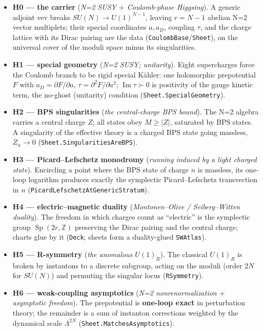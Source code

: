 \documentclass[11pt]{article}
\newcommand{\Z}{\mathbb{Z}}
\newcommand{\Sp}{\operatorname{Sp}}
\newcommand{\Imag}{\operatorname{Im}}
\newcommand{\code}[1]{\texttt{#1}}
\begin{document}
\begin{itemize}
\item \textbf{H0 --- the carrier} (\emph{N=2 SUSY $+$ Coulomb-phase Higgsing}). A generic adjoint
vev breaks $SU(N)\to U(1)^{N-1}$, leaving $r=N-1$ abelian N=2 vector multiplets; their special
coordinates $a, a_D$, coupling $\tau$, and the charge lattice with its Dirac pairing are the data
(\code{CoulombBase}/\code{Sheet}), on the universal cover of the moduli space minus its singularities.
\item \textbf{H1 --- special geometry} (\emph{N=2 SUSY; unitarity}). Eight supercharges force the
Coulomb branch to be rigid special K\"ahler: one holomorphic prepotential $F$ with
$a_D = \partial F/\partial a$, $\tau = \partial^2 F/\partial a^2$; $\Imag\tau\succ 0$ is positivity
of the gauge kinetic term, the no-ghost (unitarity) condition (\code{Sheet.SpecialGeometry}).
\item \textbf{H2 --- BPS singularities} (\emph{the central-charge BPS bound}). The N=2 algebra
carries a central charge $Z$; all states obey $M\ge|Z|$, saturated by BPS states. A singularity of
the effective theory is a charged BPS state going massless, $Z_n\to 0$
(\code{Sheet.SingularitiesAreBPS}).
\item \textbf{H3 --- Picard--Lefschetz monodromy} (\emph{running induced by a light charged state}).
Encircling a point where the BPS state of charge $n$ is massless, its one-loop logarithm produces
exactly the symplectic Picard--Lefschetz transvection in $n$
(\code{PicardLefschetzAtGenericStratum}).
\item \textbf{H4 --- electric--magnetic duality} (\emph{Montonen--Olive / Seiberg--Witten duality}).
The freedom in which charges count as ``electric'' is the symplectic group $\Sp(2r,\Z)$ preserving
the Dirac pairing and the central charge; charts glue by it (\code{Deck}; sheets form a
duality-glued \code{SWAtlas}).
\item \textbf{H5 --- R-symmetry} (\emph{the anomalous $U(1)_R$}). The classical $U(1)_R$ is broken
by instantons to a discrete subgroup, acting on the moduli (order $2N$ for $SU(N)$) and permuting
the singular locus (\code{RSymmetry}).
\item \textbf{H6 --- weak-coupling asymptotics} (\emph{N=2 nonrenormalization $+$ asymptotic
freedom}). The prepotential is \textbf{one-loop exact} in perturbation theory; the remainder is a
sum of instanton corrections weighted by the dynamical scale $\Lambda^{2N}$
(\code{Sheet.MatchesAsymptotics}).
\end{itemize}
\end{document}

